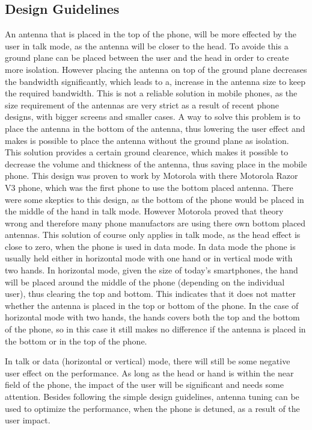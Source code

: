 \subsection{Design Guidelines}
An antenna that is placed in the top of the phone, will be more effected by the user in talk mode, as the antenna will be closer to the head. To avoide this a ground plane can be placed between the user and the head in order to create more isolation. However placing the antenna on top of the ground plane decreases the bandwidth significantly, which leads to a, increase in the antenna size to keep the required bandwidth. This is not a reliable solution in mobile phones, as the size requirement of the antennas are very strict as a result of recent phone designs, with bigger screens and smaller cases. A way to solve this problem is to place the antenna in the bottom of the antenna, thus lowering the user effect and makes is possible to place the antenna without the ground plane as isolation. This solution provides a certain ground clearence, which makes it possible to decrease the volume and thickness of the antenna, thus saving place in the mobile phone. 
This design was proven to work by Motorola with there Motorola Razor V3 phone, which was the first phone to use the bottom placed antenna. There were some skeptics to this design, as the bottom of the phone would be placed in the middle of the hand in talk mode. However Motorola proved that theory wrong and therefore many phone manufactors are using there own bottom placed antennas. This solution of course only applies in talk mode, as the head effect is close to zero, when the phone is used in data mode. In data mode the phone is usually held either in horizontal mode with one hand or in vertical mode with two hands. In horizontal mode, given the size of today's smartphones, the hand will be placed around the middle of the phone (depending on the individual user), thus clearing the top and bottom. This indicates that it does not matter whether the antenna is placed in the top or bottom of the phone. In the case of horizontal mode with two hands, the hands covers both the top and the bottom of the phone, 
so in this case it still makes no difference if the antenna is placed in the bottom or in the top of the phone. 


In talk or data (horizontal or vertical) mode, there will still be some negative user effect on the performance. As long as the head or hand is within the near field of the phone, the impact of the user will be significant and needs some attention. Besides following the simple design guidelines, antenna tuning can be used to optimize the performance, when the phone is detuned, as a result of the user impact.


